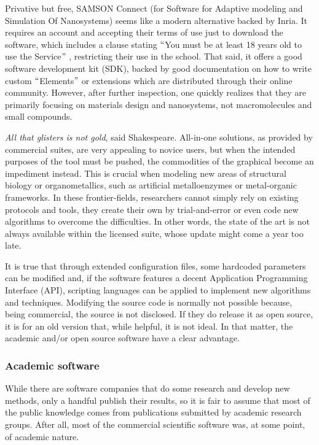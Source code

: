 Privative but free, SAMSON Connect (for Software for Adaptive modeling and Simulation Of Nanosystems) seems like a modern alternative backed by Inria. It requires an account and accepting their terms of use just to download the software, which includes a clause stating $``$You must be at least 18 years old to use the Service$"$ , restricting their use in the school. That said, it offers a good software development kit (SDK), backed by good documentation on how to write custom $``$Elements$"$  or extensions which are distributed through their online community. However, after further inspection, one quickly realizes that they are primarily focusing on materials design and nanosystems, not macromolecules and small compounds.


\textit{All that glisters is not gold}, said Shakespeare. All-in-one solutions, as provided by commercial suites, are very appealing to novice users, but when the intended purposes of the tool must be pushed, the commodities of the graphical become an impediment instead. This is crucial when modeling new areas of structural biology or organometallics, such as artificial metalloenzymes or metal-organic frameworks. In these frontier-fields, researchers cannot simply rely on existing protocols and tools, they create their own by trial-and-error or even code new algorithms to overcome the difficulties. In other words, the state of the art is not always available within the licensed suite, whose update might come a year too late.

It is true that through extended configuration files, some hardcoded parameters can be modified and, if the software features a decent Application Programming Interface (API), scripting languages can be applied to implement new algorithms and techniques. Modifying the source code is normally not possible because, being commercial, the source is not disclosed. If they do release it as open source, it is for an old version that, while helpful, it is not ideal.\cite{delano2002pymol} In that matter, the academic and/or open source software have a clear advantage.

\subsubsection{Academic software}
While there are software companies that do some research and develop new methods, only a handful publish their results, so it is fair to assume that most of the public knowledge comes from publications submitted by academic research groups. After all, most of the commercial scientific software was, at some point, of academic nature.\cite{gaussian,schrodingerpymol}

